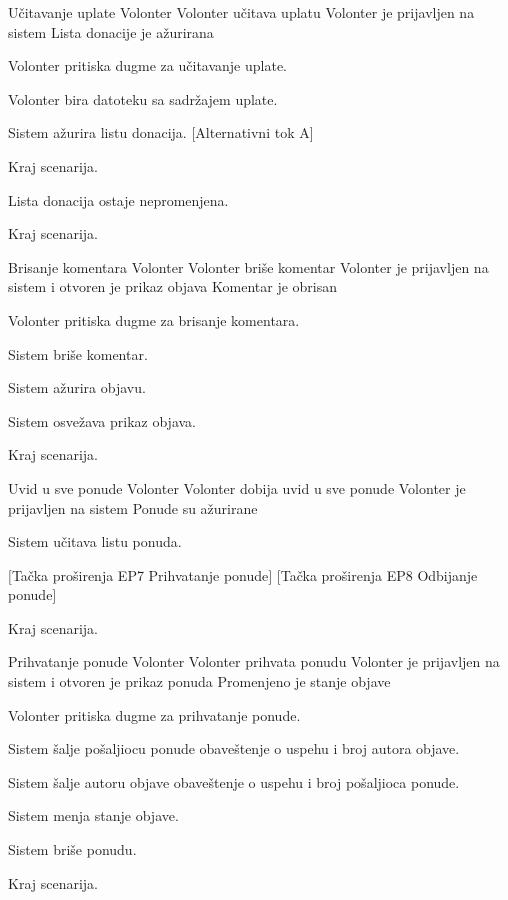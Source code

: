         {Učitavanje uplate}
        {Volonter}
        {Volonter učitava uplatu}
        {Volonter je prijavljen na sistem}
        {Lista donacije je ažurirana}
        {
            \item Volonter pritiska dugme za učitavanje uplate.
            \item Volonter bira datoteku sa sadržajem uplate.
            \item Sistem ažurira listu donacija. [Alternativni tok A]
            \item Kraj scenarija.
        }
        {
            {
                    \item Lista donacija ostaje nepromenjena.
                    \item Kraj scenarija.
            }
        }
        
        {Brisanje komentara}
        {Volonter}
        {Volonter briše komentar}
        {Volonter je prijavljen na sistem i otvoren je prikaz objava}
        {Komentar je obrisan}
        {
            \item Volonter pritiska dugme za brisanje komentara.
            \item Sistem briše komentar.
            \item Sistem ažurira objavu.
            \item Sistem osvežava prikaz objava.
            \item Kraj scenarija.
        }
        {}
        
        {Uvid u sve ponude}
        {Volonter}
        {Volonter dobija uvid u sve ponude}
        {Volonter je prijavljen na sistem}
        {Ponude su ažurirane}
        {
            \item Sistem učitava listu ponuda.
            \item $[$Tačka proširenja EP7 Prihvatanje ponude$]$ $[$Tačka proširenja EP8 Odbijanje ponude$]$
            \item Kraj scenarija.
        }
        {}

        {Prihvatanje ponude}
        {Volonter}
        {Volonter prihvata ponudu}
        {Volonter je prijavljen na sistem i otvoren je prikaz ponuda}
        {Promenjeno je stanje objave}
        {
            \item Volonter pritiska dugme za prihvatanje ponude. 
            \item Sistem šalje pošaljiocu ponude obaveštenje o uspehu i broj  autora objave.
            \item Sistem šalje autoru objave obaveštenje o uspehu i broj pošaljioca ponude.
            \item Sistem menja stanje objave.
            \item Sistem briše ponudu.
            \item Kraj scenarija.
        }
        {}
        
